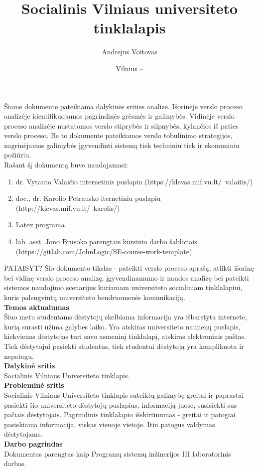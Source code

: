 \documentclass{VUMIFPSkursinis}
\title{Socialinis Vilniaus universiteto tinklalapis}
\author{Andrejus Voitovas}
\date{Vilnius – \the\year}
\begin{document}
\maketitle
\cleardoublepage{}
\setcounter{page}{2}
Šiame dokumente pateikiama dalykinės srities analizė. Išorinėje verslo proceso analizėje identifikuojamos pagrindinės grėsmės ir galimybės. Vidinėje verslo proceso analizėje nustatomos verslo stiprybės ir silpnybės, kylančios iš paties verslo proceso. Be to dokumente pateikiamos verslo tobulinimo strategijos, nagrinėjamos galimybės įgyvendinti sistemą tiek techniniu tiek ir ekonominiu požiūriu.\\
Rašant šį dokumentą buvo naudojamasi:
\begin{enumerate}
	\item dr. Vytauto Valaičio internetinis puslapiu (https://klevas.mif.vu.lt/~valaitis/) 
	\item doc., dr. Karolio Petrausko iternetiniu puslapiu (http://klevas.mif.vu.lt/~karolis/) 
	\item Latex programa
	\item lab. asst. Jono Brusoko parengtais kursinio darbo šablonais (https://gitlab.com/JohnLogic/SE-course-work-template)
	
\end{enumerate}
\newpage
\tableofcontents

PATAISYT?
Šio dokumento tikslas - pateikti verslo proceso aprašą, atlikti išorinę bei vidinę verslo proceso analizę, įgyvendinamumo ir naudos analizę bei pateikti sistemos naudojimo scenarijus kuriamam universiteto socialiniam tinklalapiui, kuris palengvintų universiteto bendruomenės komunikaciją.\\
\textbf{Temos aktualumas} \\
Šiuo metu studentams dėstytojų skelbiama informacija yra išbarstyta internete, kurią surasti užima galybes laiko. Yra atskiras universiteto naujienų puslapis, kiekvienas dėstytojas turi savo asmeninį tinklalapį, atskiras elektroninis paštas. Tiek dėstytojui pasiekti studentus, tiek studentui dėstytoją yra komplikuota ir nepatogu.\\
\textbf{Dalykinė sritis}\\
Socialinis Vilniaus Universiteto tinklapis.\\
 \textbf{Probleminė sritis}\\
Socialinis Vilniaus Universiteto tinklapis suteiktų galimybę greitai ir paprastai pasiekti šio universiteto dėstytojų puslapius, informaciją juose, susisiekti sus pačiais dėstytojais. Pagrindinis tinklalapio išskirtinumas - greitai ir patogiai pasiekiama informacija, viskas vienoje vietoje. Itin patogus valdymas dėstytojams.\\
 \textbf{Darbo pagrindas} \\ 
Dokumentas parengtas kaip Programų sistemų inžinerijos III laboratorinis darbas.
\newpage
{}
\end{document}
